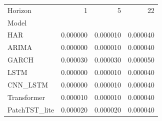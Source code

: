 \begin{tabular}{lrrr}
\toprule
Horizon & 1 & 5 & 22 \\
Model &  &  &  \\
\midrule
HAR & 0.000000 & 0.000010 & 0.000040 \\
ARIMA & 0.000000 & 0.000010 & 0.000040 \\
GARCH & 0.000030 & 0.000030 & 0.000050 \\
LSTM & 0.000000 & 0.000010 & 0.000040 \\
CNN_LSTM & 0.000000 & 0.000010 & 0.000040 \\
Transformer & 0.000010 & 0.000010 & 0.000040 \\
PatchTST_lite & 0.000020 & 0.000020 & 0.000040 \\
\bottomrule
\end{tabular}
